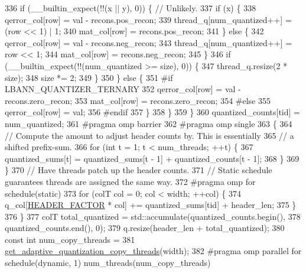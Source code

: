 \begin{DoxyCode}
336         \textcolor{keywordflow}{if} (\_\_builtin\_expect(!!(x || y), 0)) \{  \textcolor{comment}{// Unlikely.}
337           \textcolor{keywordflow}{if} (x) \{
338             qerror\_col[row] = val - recons.pos\_recon;
339             thread\_q[num\_quantized++] = (row << 1) | 1;
340             mat\_col[row] = recons.pos\_recon;
341           \} \textcolor{keywordflow}{else} \{
342             qerror\_col[row] = val - recons.neg\_recon;
343             thread\_q[num\_quantized++] = row << 1;
344             mat\_col[row] = recons.neg\_recon;
345           \}
346           \textcolor{keywordflow}{if} (\_\_builtin\_expect(!!(num\_quantized >= size), 0)) \{
347             thread\_q.resize(2 * size);
348             size *= 2;
349           \}
350         \} \textcolor{keywordflow}{else} \{
351 \textcolor{preprocessor}{#if LBANN\_QUANTIZER\_TERNARY}
352           qerror\_col[row] = val - recons.zero\_recon;
353           mat\_col[row] = recons.zero\_recon;
354 \textcolor{preprocessor}{#else}
355           qerror\_col[row] = val;
356 \textcolor{preprocessor}{#endif}
357         \}
358       \}
359     \}
360     quantized\_counts[tid] = num\_quantized;
361 \textcolor{preprocessor}{    #pragma omp barrier}
362 \textcolor{preprocessor}{    #pragma omp single}
363     \{
364       \textcolor{comment}{// Compute the amount to adjust header counts by. This is essentially}
365       \textcolor{comment}{// a shifted prefix-sum.}
366       \textcolor{keywordflow}{for} (\textcolor{keywordtype}{int} t = 1; t < num\_threads; ++t) \{
367         quantized\_sums[t] = quantized\_sums[t - 1] + quantized\_counts[t - 1];
368       \}
369     \}
370     \textcolor{comment}{// Have threads patch up the header counts.}
371     \textcolor{comment}{// Static schedule guarantees threads are assigned the same way.}
372 \textcolor{preprocessor}{    #pragma omp for schedule(static)}
373     \textcolor{keywordflow}{for} (colT col = 0; col < width; ++col) \{
374       q\_col[\hyperlink{classlbann_1_1lbann__quantizer_afb4315625e371169cabfac56c3f75d37}{HEADER\_FACTOR} * col] += quantized\_sums[tid] + header\_len;
375     \}
376   \}
377   colT total\_quantized = std::accumulate(quantized\_counts.begin(),
378                                          quantized\_counts.end(), 0);
379   q.resize(header\_len + total\_quantized);
380   \textcolor{keyword}{const} \textcolor{keywordtype}{int} num\_copy\_threads =
381     \hyperlink{classlbann_1_1lbann__quantizer_a22b898932caed41ccf24abcb67c00ba1}{get\_adaptive\_quantization\_copy\_threads}(width);
382 \textcolor{preprocessor}{  #pragma omp parallel for schedule(dynamic, 1) num\_threads(num\_copy\_threads)}

\end{DoxyCode}
